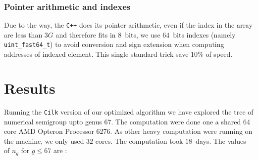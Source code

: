\documentclass[reqno,11pt]{amsart}
\theoremstyle{plain}
\theoremstyle{definition}
\newcommand{\Cilk}{\texttt{Cilk}\xspace}
\newcommand{\CPP}{\texttt{C++}\xspace}
\renewcommand{\leq}{\leqslant}
\begin{document}
\subsubsection*{Pointer arithmetic and indexes}

Due to the way, the \CPP does its pointer arithmetic, even if the index in the
array are less than $3G$ and therefore fits in $8$~bits, we use $64$~bits
indexes (namely \verb|uint_fast64_t|) to avoid conversion and sign extension
when computing addresses of indexed element. This single standard trick save
10\% of speed.

\section{Results}

Running the \Cilk version of our optimized algorithm we have explored the tree
of numerical semigroup upto genus $67$. The computation were done one a shared
$64$ core AMD Opteron\texttrademark{} Processor 6276. As other heavy
computation were running on the machine, we only used $32$ cores. The
computation took $18$~days. The values of $n_g$ for $g\leq 67$ are :
\end{document}
